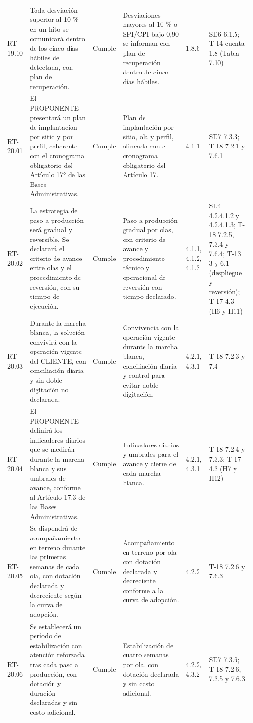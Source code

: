 \documentclass[carta,firma,final]{lafrox}
\begin{document}
\begin{landscape}
{\begin{longtable}{@{}F{0.070} F{0.255} F{0.075} F{0.280} F{0.090} F{0.230}@{}}
  RT-19.10 & Toda desviación superior al 10 \% en un hito se comunicará dentro de los cinco días hábiles de detectada, con plan de recuperación. & Cumple & Desviaciones mayores al 10 \% o SPI/CPI bajo 0,90 se informan con plan de recuperación dentro de cinco días hábiles. & 1.8.6 & SD6 6.1.5; T-14 cuenta 1.8 (Tabla 7.10) \\
  RT-20.01 & El PROPONENTE presentará un plan de implantación por sitio y por perfil, coherente con el cronograma obligatorio del Artículo 17° de las Bases Administrativas. & Cumple & Plan de implantación por sitio, ola y perfil, alineado con el cronograma obligatorio del Artículo 17. & 4.1.1 & SD7 7.3.3; T-18 7.2.1 y 7.6.1 \\
  RT-20.02 & La estrategia de paso a producción será gradual y reversible. Se declarará el criterio de avance entre olas y el procedimiento de reversión, con su tiempo de ejecución. & Cumple & Paso a producción gradual por olas, con criterio de avance y procedimiento técnico y operacional de reversión con tiempo declarado. & 4.1.1, 4.1.2, 4.1.3 & SD4 4.2.4.1.2 y 4.2.4.1.3; T-18 7.2.5, 7.3.4 y 7.6.4; T-13 3 y 6.1 (despliegue y reversión); T-17 4.3 (H6 y H11) \\
  RT-20.03 & Durante la marcha blanca, la solución convivirá con la operación vigente del CLIENTE, con conciliación diaria y sin doble digitación no declarada. & Cumple & Convivencia con la operación vigente durante la marcha blanca, conciliación diaria y control para evitar doble digitación. & 4.2.1, 4.3.1 & T-18 7.2.3 y 7.4 \\
  RT-20.04 & El PROPONENTE definirá los indicadores diarios que se medirán durante la marcha blanca y sus umbrales de avance, conforme al Artículo 17.3 de las Bases Administrativas. & Cumple & Indicadores diarios y umbrales para el avance y cierre de cada marcha blanca. & 4.2.1, 4.3.1 & T-18 7.2.4 y 7.3.3; T-17 4.3 (H7 y H12) \\
  RT-20.05 & Se dispondrá de acompañamiento en terreno durante las primeras semanas de cada ola, con dotación declarada y decreciente según la curva de adopción. & Cumple & Acompañamiento en terreno por ola con dotación declarada y decreciente conforme a la curva de adopción. & 4.2.2 & T-18 7.2.6 y 7.6.3 \\
  RT-20.06 & Se establecerá un período de estabilización con atención reforzada tras cada paso a producción, con dotación y duración declaradas y sin costo adicional. & Cumple & Estabilización de cuatro semanas por ola, con dotación declarada y sin costo adicional. & 4.2.2, 4.3.2 & SD7 7.3.6; T-18 7.2.6, 7.3.5 y 7.6.3 \\

\end{longtable}}
\end{landscape}
\end{document}
